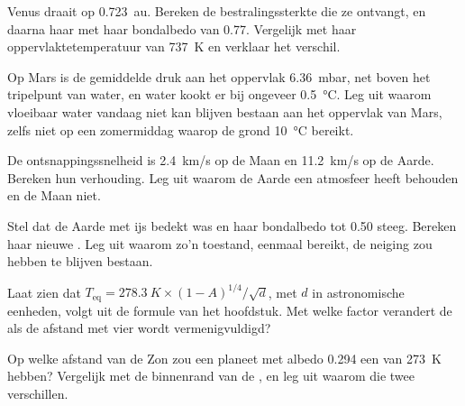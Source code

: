 \begin{exercise}[$\star\star$]\label{exo:g10:habitable-planet:8}
Venus draait op \qty{0.723}{au}. Bereken de bestralingssterkte die ze ontvangt,
en daarna haar  met haar bondalbedo van 0.77. Vergelijk met
haar oppervlaktetemperatuur van \qty{737}{K} en verklaar het verschil.
\end{exercise}

\begin{exercise}[$\star\star$]\label{exo:g10:habitable-planet:9}
Op Mars is de gemiddelde druk aan het oppervlak \qty{6.36}{mbar}, net boven het
tripelpunt van water, en water kookt er bij ongeveer \qty{0.5}{\degreeCelsius}.
Leg uit waarom vloeibaar water vandaag niet kan blijven bestaan aan het oppervlak
van Mars, zelfs niet op een zomermiddag waarop de grond \qty{10}{\degreeCelsius} bereikt.
\end{exercise}

\begin{exercise}[$\star\star$]\label{exo:g10:habitable-planet:10}
De ontsnappingssnelheid is \qty{2.4}{km/s} op de Maan en \qty{11.2}{km/s} op
de Aarde. Bereken hun verhouding. Leg uit waarom de Aarde een atmosfeer heeft
behouden en de Maan niet.
\end{exercise}

\begin{exercise}[$\star\star$]\label{exo:g10:habitable-planet:11}
Stel dat de Aarde met ijs bedekt was en haar bondalbedo tot 0.50 steeg.
Bereken haar nieuwe . Leg uit waarom zo'n toestand, eenmaal
bereikt, de neiging zou hebben te blijven bestaan.
\end{exercise}

\begin{exercise}[$\star\star\star$]\label{exo:g10:habitable-planet:12}
Laat zien dat $T_{\mathrm{eq}} = \qty{278.3}{K} \times (1-A)^{1/4}/\sqrt{d}$, met
$d$ in astronomische eenheden, volgt uit de formule van het hoofdstuk. Met welke
factor verandert de  als de afstand met vier wordt
vermenigvuldigd?
\end{exercise}

\begin{exercise}[$\star\star\star$]\label{exo:g10:habitable-planet:13}
Op welke afstand van de Zon zou een planeet met albedo 0.294 een
 van \qty{273}{K} hebben? Vergelijk met de binnenrand van
de , en leg uit waarom die twee verschillen.
\end{exercise}

